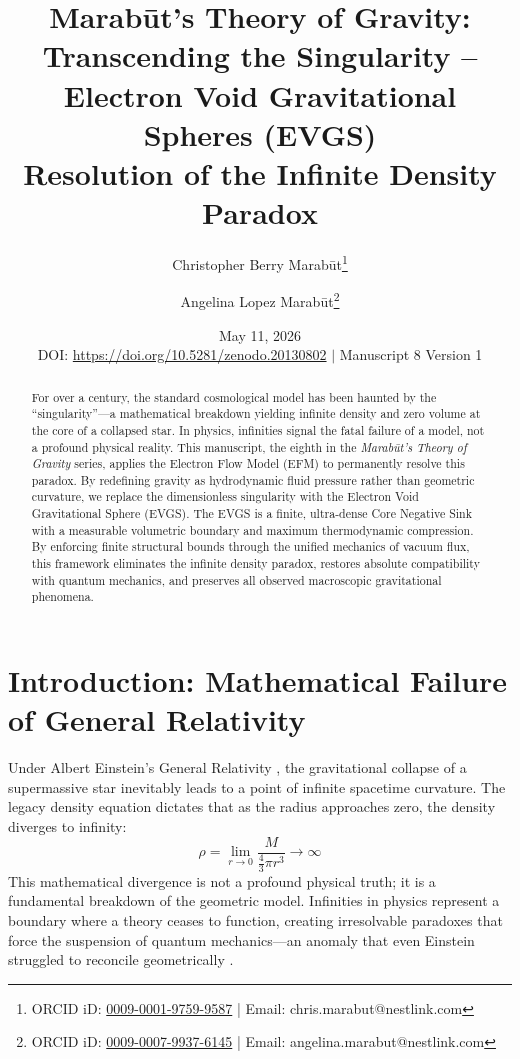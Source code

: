 \documentclass[11pt, a4paper]{article}
\title{\textbf{Marab\={u}t's Theory of Gravity: \\ Transcending the Singularity -- \\ Electron Void Gravitational Spheres (EVGS)} \\[1em] \large{Resolution of the Infinite Density Paradox}}
\author[1]{Christopher Berry Marab\={u}t\thanks{ORCID iD: \href{https://orcid.org/0009-0001-9759-9587}{0009-0001-9759-9587} | Email: chris.marabut@nestlink.com}}
\author[1]{Angelina Lopez Marab\={u}t\thanks{ORCID iD: \href{https://orcid.org/0009-0007-9937-6145}{0009-0007-9937-6145} | Email: angelina.marabut@nestlink.com}}
\affil[1]{Independent Researchers}
\date{May 11, 2026 \\[1.5em] \small{DOI: \url{https://doi.org/10.5281/zenodo.20130802} $|$ Manuscript 8 Version 1}}
\begin{document}

\maketitle

\begin{abstract}
  For over a century, the standard cosmological model has been haunted by the ``singularity''---a mathematical breakdown yielding infinite density and zero volume at the core of a collapsed star. In physics, infinities signal the fatal failure of a model, not a profound physical reality. This manuscript, the eighth in the \textit{Marab\={u}t's Theory of Gravity} series, applies the Electron Flow Model (EFM) to permanently resolve this paradox. By redefining gravity as hydrodynamic fluid pressure rather than geometric curvature, we replace the dimensionless singularity with the Electron Void Gravitational Sphere (EVGS). The EVGS is a finite, ultra-dense Core Negative Sink with a measurable volumetric boundary and maximum thermodynamic compression. By enforcing finite structural bounds through the unified mechanics of vacuum flux, this framework eliminates the infinite density paradox, restores absolute compatibility with quantum mechanics, and preserves all observed macroscopic gravitational phenomena.
\end{abstract}

\section{Introduction: Mathematical Failure of General Relativity}
  Under Albert Einstein's General Relativity \cite{einstein2012}, the gravitational collapse of a supermassive star inevitably leads to a point of infinite spacetime curvature. The legacy density equation dictates that as the radius approaches zero, the density diverges to infinity:
  \begin{equation}
    \rho = \lim_{r \to 0} \frac{M}{\frac{4}{3}\pi r^3} \to \infty
  \end{equation}
  This mathematical divergence is not a profound physical truth; it is a fundamental breakdown of the geometric model. Infinities in physics represent a boundary where a theory ceases to function, creating irresolvable paradoxes that force the suspension of quantum mechanics---an anomaly that even Einstein struggled to reconcile geometrically \cite{norton2024}. 
  
\end{document}
